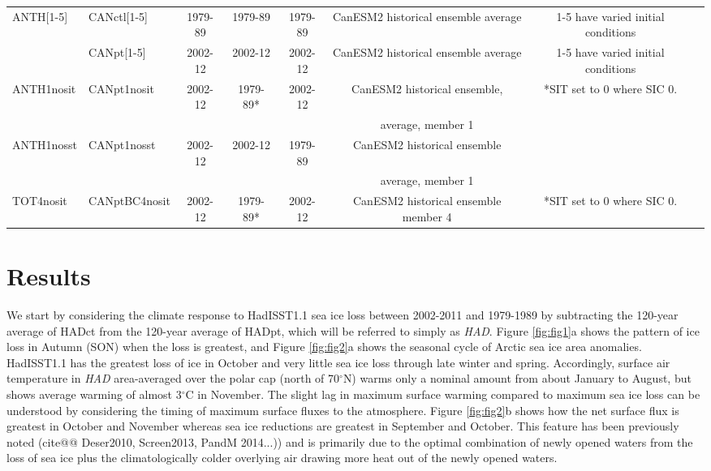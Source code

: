 \documentclass[twocol]{ametsoc}
\begin{document}
\begin{table}[t]
\begin{center}
\begin{tabular}{llcccccc}
 ANTH[1-5] &  CANctl[1-5] &    1979-89 & 1979-89 & 1979-89 & CanESM2 historical ensemble average & 1-5 have varied initial conditions \\
                   & CANpt[1-5] & 2002-12 & 2002-12 & 2002-12 &  CanESM2 historical ensemble average &  1-5 have varied initial conditions \\
  \hline
 \hline
 ANTH1nosit   & CANpt1nosit &     2002-12 & 1979-89* & 2002-12 &  CanESM2 historical ensemble, & *SIT set to 0 where SIC 0. \\
                       &                       &                 &                  &              &       average, member 1             & \\
ANTH1nosst  &  CANpt1nosst &      2002-12 & 2002-12 & 1979-89 &  CanESM2 historical ensemble  & \\
                        &                       &                 &                  &              &       average, member 1             & \\
TOT4nosit   &  CANptBC4nosit  &    2002-12 & 1979-89* & 2002-12 &  CanESM2 historical ensemble member 4 & *SIT set to 0 where SIC 0. \\
\hline
\end{tabular}
\end{center}
\end{table}


\section{Results}

We start by considering the climate response to HadISST1.1 sea ice loss between 2002-2011 and 1979-1989 by subtracting the 120-year average of HADct from the 120-year average of HADpt, which will be referred to simply as \textit{HAD}. Figure \ref{fig:fig1}a shows the pattern of ice loss in Autumn (SON) when the loss is greatest, and Figure \ref{fig:fig2}a shows the seasonal cycle of Arctic sea ice area anomalies. HadISST1.1 has the greatest loss of ice in October and very little sea ice loss through late winter and spring. Accordingly, surface air temperature in \textit{HAD} area-averaged over the polar cap (north of 70$^\circ$N) warms only a nominal amount from about January to August, but shows average warming of almost 3$^\circ$C in November. The slight lag in maximum surface warming compared to maximum sea ice loss can be understood by considering the timing of maximum surface fluxes to the atmosphere. Figure \ref{fig:fig2}b shows how the net surface flux is greatest in October and November whereas sea ice reductions are greatest in September and October. This feature has been previously noted (cite@@ Deser2010, Screen2013, PandM 2014...)) and is primarily due to the optimal combination of newly opened waters from the loss of sea ice plus the climatologically colder overlying air drawing more heat out of the newly opened waters. 
\end{document}
